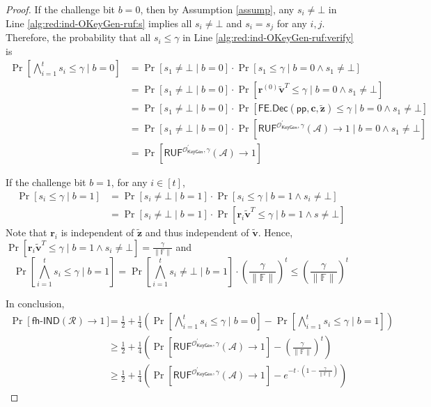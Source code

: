 \begin{proof}
If the challenge bit $b = 0$, then by Assumption \ref{assump}, any $s_i \neq \bot$ in Line \ref{alg:red:ind-OKeyGen-ruf:s} implies all $s_i \neq \bot$ and $s_i = s_j$ for any $i, j$. Therefore, the probability that all $s_i \leq \gamma$ in Line \ref{alg:red:ind-OKeyGen-ruf:verify} is
\begin{align*}
	\Pr\left[ \bigwedge_{i=1}^t s_i \leq \gamma \mid b = 0 \right]
	&= \Pr\left[ s_1 \neq \bot \mid b = 0 \right] \cdot \Pr \left[ s_1 \leq \gamma \mid b = 0 \wedge s_1 \neq \bot \right] \\
	&= \Pr \left[ s_1 \neq \bot \mid b = 0 \right] \cdot \Pr \left[ \mathbf{r}^{(0)} \mathbf{\tilde{v}}^T \leq \gamma \mid b = 0 \wedge s_1 \neq \bot \right] \\
	&= \Pr \left[s_1 \neq \bot \mid b = 0 \right] \cdot \Pr \left[ \textsf{FE.Dec}(\textsf{pp}, \mathbf{c}, \mathbf{\tilde{z}}) \leq \gamma \mid b = 0 \wedge s_1 \neq \bot \right] \\
	&= \Pr \left[s_1 \neq \bot \mid b = 0 \right] \cdot \Pr \left[ \textsf{RUF}^{\mathcal{O}^\prime_{\textsf{KeyGen}}, \gamma}(\mathcal{A}) \to 1 \mid b = 0 \wedge s_1 \neq \bot \right] \\ 
	&= \Pr \left[ \textsf{RUF}^{\mathcal{O}^\prime_{\textsf{KeyGen}}, \gamma}(\mathcal{A}) \to 1 \right] 
\end{align*}

If the challenge bit $b = 1$, for any $i \in [t]$,
\begin{align*}
	\Pr[ s_i \leq \gamma \mid b = 1 ]
	&= \Pr[s_i \neq \bot \mid b = 1] \cdot \Pr[ s_i \leq \gamma \mid b = 1 \wedge s_i \neq \bot] \\
	&= \Pr[s_i \neq \bot \mid b = 1] \cdot \Pr[ \mathbf{r}_i \mathbf{\tilde{v}}^T \leq \gamma \mid b = 1 \wedge s \neq \bot]
\end{align*}
Note that $\mathbf{r}_i$ is independent of $\mathbf{\tilde{z}}$ and thus independent of $\mathbf{\tilde{v}}$. Hence, $\Pr[\mathbf{r}_i \mathbf{\tilde{v}}^T \leq \gamma \mid b = 1 \wedge s_i \neq \bot] = \frac{\gamma}{\| \mathbb{F} \|}$ and
\[
	\Pr \left[ \bigwedge_{i=1}^t s_i \leq \gamma \mid b = 1 \right] = \Pr \left[ \bigwedge_{i=1}^t s_i \neq \bot \mid b = 1 \right] \cdot \left( \frac{\gamma}{\| \mathbb{F} \|} \right)^t \leq \left( \frac{\gamma}{\| \mathbb{F} \|} \right)^t
\]

In conclusion,
\begin{align*}
	\Pr[\textsf{fh-IND}(\mathcal{R}) \to 1] 
	&= \frac{1}{2} + \frac{1}{4} \left( \Pr \left[ \bigwedge_{i=1}^t s_i \leq \gamma \mid b = 0 \right] - \Pr \left[ \bigwedge_{i=1}^t s_i \leq \gamma \mid b = 1 \right] \right) \\
	&\geq \frac{1}{2} + \frac{1}{4} \left( \Pr[ \textsf{RUF}^{\mathcal{O}^\prime_{\textsf{KeyGen}}, \gamma}(\mathcal{A}) \to 1] - \left( \frac{\gamma}{\| \mathbb{F} \|} \right)^t \right) \\
	&\geq \frac{1}{2} + \frac{1}{4} \left( \Pr[ \textsf{RUF}^{\mathcal{O}^\prime_{\textsf{KeyGen}}, \gamma}(\mathcal{A}) \to 1] -  e^{- t \cdot (1 - \frac{\gamma}{\| \mathbb{F} \|}) } \right)
\end{align*}


\end{proof}

